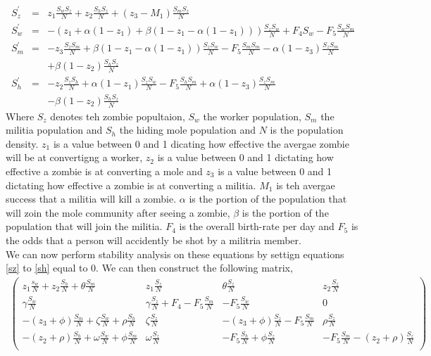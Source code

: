 \documentclass{mm2}
\numberwithin{equation}{section}
\theoremstyle{definition}
\begin{document}
\begin{eqnarray}
S_z^{'} &=& z_1 \frac{S_wS_z}{N} + z_2 \frac{S_hS_z}{N} + (z_3 - M_1) \frac{S_mS_z}{N} \label{sz}\\
S_w^{'} &=& -(z_1 + \alpha(1-z_1) + \beta(1-z_1- \alpha(1-z_1)))\frac{S_zS_w}{N} + F_4S_w  - F_5\frac{S_wS_m}{N}\\
S_m^{'} &=& - z_3 \frac{S_z S_m}{N} + \beta(1-z_1-\alpha(1-z_1))\frac{S_zS_w}{N} - F_5 \frac{S_mS_m}{N} - \alpha(1-z_3) \frac{S_zS_m}{N} \nonumber \\&& + \beta(1-z_2)\frac{S_hS_z}{N} \\
S_h^{'} &=& - z_2 \frac{S_z S_h}{N} + \alpha(1-z_1)\frac{S_z S_w}{N} - F_5 \frac{S_h S_m}{N} + \alpha (1-z_3) \frac{S_z S_m}{N} \nonumber \\ &&- \beta (1-z_2) \frac{S_hS_z}{N} \label{sh}
\end{eqnarray}
Where $S_z$ denotes teh zombie popultaion, $S_w$ the worker population, $S_m$ the militia population and $S_h$ the hiding mole population and $N$ is the population density. $z_1$ is a value between 0 and 1 dicating how effective the avergae zombie will be at convertigng a worker, $z_2$ is a value between 0 and 1 dictating how effective a zombie is at converting a mole and $z_3$ is a value between 0 and 1 dictating how effective a zombie is at converting a militia. $M_1$ is teh avergae success that a militia will kill a zombie. $\alpha$ is the portion of the population that will zoin the mole community after seeing a zombie, $\beta$ is the portion of the population that will join the militia. $F_4$ is the overall birth-rate per day and $F_5$ is the odds that a person will accidently be shot by a militria member.\\
We can now perform stability analysis on these equations by settign equations \ref{sz} to \ref{sh} equal to 0. We can then construct the following matrix,
\begin{eqnarray}
\begin{pmatrix}
z_1 \frac{s_w}{N} + z_2 \frac{S_h}{N} + \theta\frac{S_m}{N} & z_1 \frac{S_z}{N} & \theta\frac{S_z}{N} & z_2 \frac{S_z}{N}\\
\gamma\frac{S_w}{N} & \gamma\frac{S_z}{N} + F_4 - F_5\frac{S_m}{N} & - F_5\frac{S_w}{N} & 0 \\
- (z_3 + \phi) \frac{S_m}{N} + \zeta\frac{S_w}{N} + \rho\frac{S_h}{N} & \zeta\frac{S_z}{N} & - (z_3+ \phi)\frac{S_z}{N} - F_5 \frac{S_m}{N} & \rho \frac{S_z}{N}\\
- (z_2 + \rho) \frac{ S_h}{N} + \omega\frac{S_w}{N} + \phi \frac{S_m}{N} &  \omega\frac{S_z}{N} & - F_5 \frac{S_h}{N} + \phi \frac{S_z}{N} & - F_5 \frac{S_m}{N} - (z_2 + \rho)\frac{S_z}{N}\\
\end{pmatrix}
\nonumber
\end{eqnarray}
\end{document}
